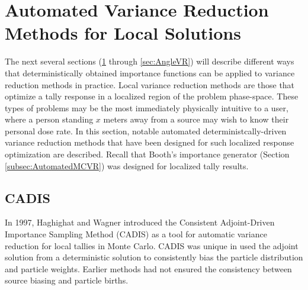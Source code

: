 \section{Automated Variance Reduction Methods for Local Solutions}
\label{sec:localVR}

The next several sections (\ref{sec:localVR} through \ref{sec:AngleVR})
will describe different ways that deterministically obtained importance
functions
can be applied to variance reduction methods in practice. Local variance
reduction methods are those that optimize a tally response in a localized region
of the problem phase-space. These types of problems may be the most immediately
physically intuitive to a user,
where a person standing $x$ meters away from a source may wish to know their
personal dose rate. In this section, notable
automated deterministcally-driven variance reduction methods that
have been designed for such localized response optimization are described.
Recall that Booth's importance generator (Section \ref{subsec:AutomatedMCVR})
was designed for localized tally results.

\subsection{CADIS}
\label{sec:CADIS}

In 1997, Haghighat and Wagner introduced the Consistent Adjoint-Driven
Importance Sampling Method (CADIS)
\cite{wagner_automatic_1997,wagner_automated_1998,haghighat_monte_2003} as a
tool for automatic variance reduction for local tallies in Monte Carlo. CADIS
was unique in used the adjoint solution from a deterministic solution to
consistently bias the particle distribution and particle weights. Earlier
methods had not ensured the consistency between source biasing and particle
births.

